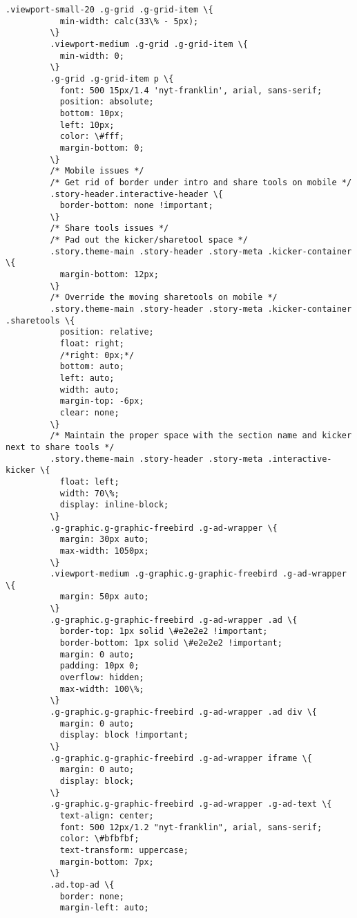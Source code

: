 \documentclass[11pt]{article}
\begin{document}
\begin{Verbatim}[commandchars=\\\{\}]
         .viewport-small-20 .g-grid .g-grid-item \{
           min-width: calc(33\% - 5px);
         \}
         .viewport-medium .g-grid .g-grid-item \{
           min-width: 0;
         \}
         .g-grid .g-grid-item p \{
           font: 500 15px/1.4 'nyt-franklin', arial, sans-serif;
           position: absolute;
           bottom: 10px;
           left: 10px;
           color: \#fff;
           margin-bottom: 0;
         \}
         /* Mobile issues */
         /* Get rid of border under intro and share tools on mobile */
         .story-header.interactive-header \{
           border-bottom: none !important;
         \}
         /* Share tools issues */
         /* Pad out the kicker/sharetool space */
         .story.theme-main .story-header .story-meta .kicker-container \{
           margin-bottom: 12px;
         \}
         /* Override the moving sharetools on mobile */
         .story.theme-main .story-header .story-meta .kicker-container .sharetools \{
           position: relative;
           float: right;
           /*right: 0px;*/
           bottom: auto;
           left: auto;
           width: auto;
           margin-top: -6px;
           clear: none;
         \}
         /* Maintain the proper space with the section name and kicker next to share tools */
         .story.theme-main .story-header .story-meta .interactive-kicker \{
           float: left;
           width: 70\%;
           display: inline-block;
         \}
         .g-graphic.g-graphic-freebird .g-ad-wrapper \{
           margin: 30px auto;
           max-width: 1050px;
         \}
         .viewport-medium .g-graphic.g-graphic-freebird .g-ad-wrapper \{
           margin: 50px auto;
         \}
         .g-graphic.g-graphic-freebird .g-ad-wrapper .ad \{
           border-top: 1px solid \#e2e2e2 !important;
           border-bottom: 1px solid \#e2e2e2 !important;
           margin: 0 auto;
           padding: 10px 0;
           overflow: hidden;
           max-width: 100\%;
         \}
         .g-graphic.g-graphic-freebird .g-ad-wrapper .ad div \{
           margin: 0 auto;
           display: block !important;
         \}
         .g-graphic.g-graphic-freebird .g-ad-wrapper iframe \{
           margin: 0 auto;
           display: block;
         \}
         .g-graphic.g-graphic-freebird .g-ad-wrapper .g-ad-text \{
           text-align: center;
           font: 500 12px/1.2 "nyt-franklin", arial, sans-serif;
           color: \#bfbfbf;
           text-transform: uppercase;
           margin-bottom: 7px;
         \}
         .ad.top-ad \{
           border: none;
           margin-left: auto;

\end{Verbatim}
\end{document}
